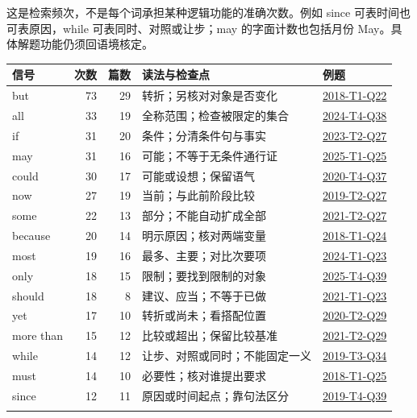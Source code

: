 \documentclass[11pt,a4paper]{article}
\begin{document}
这是检索频次，不是每个词承担某种逻辑功能的准确次数。例如 since 可表时间也可表原因，while 可表同时、对照或让步；may 的字面计数也包括月份 May。具体解题功能仍须回语境核定。

\begin{longtable}{@{}p{2.2cm}rrp{7.2cm}p{2.5cm}@{}}\toprule 信号 & 次数 & 篇数 & 读法与检查点 & 例题\\\midrule\endhead
but & 73 & 29 & 转折；另核对对象是否变化 & \hyperref[idx-2018-T1-Q22]{2018-T1-Q22}\\\addlinespace[3pt]
all & 33 & 19 & 全称范围；检查被限定的集合 & \hyperref[idx-2024-T4-Q38]{2024-T4-Q38}\\\addlinespace[3pt]
if & 31 & 20 & 条件；分清条件句与事实 & \hyperref[idx-2023-T2-Q27]{2023-T2-Q27}\\\addlinespace[3pt]
may & 31 & 16 & 可能；不等于无条件通行证 & \hyperref[idx-2025-T1-Q25]{2025-T1-Q25}\\\addlinespace[3pt]
could & 30 & 17 & 可能或设想；保留语气 & \hyperref[idx-2020-T4-Q37]{2020-T4-Q37}\\\addlinespace[3pt]
now & 27 & 19 & 当前；与此前阶段比较 & \hyperref[idx-2019-T2-Q27]{2019-T2-Q27}\\\addlinespace[3pt]
some & 22 & 13 & 部分；不能自动扩成全部 & \hyperref[idx-2021-T2-Q27]{2021-T2-Q27}\\\addlinespace[3pt]
because & 20 & 14 & 明示原因；核对两端变量 & \hyperref[idx-2018-T1-Q24]{2018-T1-Q24}\\\addlinespace[3pt]
most & 19 & 16 & 最多、主要；对比次要项 & \hyperref[idx-2024-T1-Q23]{2024-T1-Q23}\\\addlinespace[3pt]
only & 18 & 15 & 限制；要找到限制的对象 & \hyperref[idx-2025-T4-Q39]{2025-T4-Q39}\\\addlinespace[3pt]
should & 18 & 8 & 建议、应当；不等于已做 & \hyperref[idx-2021-T1-Q23]{2021-T1-Q23}\\\addlinespace[3pt]
yet & 17 & 10 & 转折或尚未；看搭配位置 & \hyperref[idx-2020-T2-Q29]{2020-T2-Q29}\\\addlinespace[3pt]
more than & 15 & 12 & 比较或超出；保留比较基准 & \hyperref[idx-2021-T2-Q29]{2021-T2-Q29}\\\addlinespace[3pt]
while & 14 & 12 & 让步、对照或同时；不能固定一义 & \hyperref[idx-2019-T3-Q34]{2019-T3-Q34}\\\addlinespace[3pt]
must & 14 & 10 & 必要性；核对谁提出要求 & \hyperref[idx-2018-T1-Q25]{2018-T1-Q25}\\\addlinespace[3pt]
since & 12 & 11 & 原因或时间起点；靠句法区分 & \hyperref[idx-2019-T4-Q39]{2019-T4-Q39}\\\addlinespace[3pt]

\end{longtable}
\end{document}
